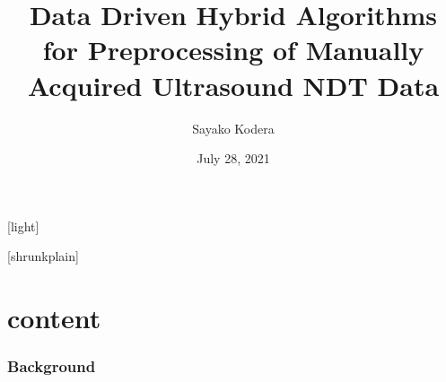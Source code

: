 \documentclass[11pt,compress,aspectratio=169]{beamer} %
\title{Data Driven Hybrid Algorithms for Preprocessing of Manually Acquired Ultrasound NDT Data}
\institute{\foreignlanguage{german}{Technische Universität Ilmenau}}
\author{Sayako Kodera}
\date{July 28, 2021}
\begin{document}
[light]
\begin{frame}[noframenumbering] %
 	\titlepage
\end{frame}

[shrunkplain]

\part{content}

\section{Background}
\end{document}
